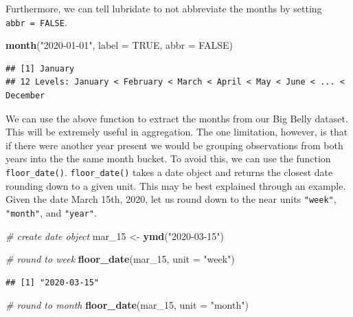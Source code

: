\documentclass[
]{book}
\newenvironment{Shaded}{\begin{snugshade}}{\end{snugshade}}
\newcommand{\CommentTok}[1]{\textcolor[rgb]{0.56,0.35,0.01}{\textit{#1}}}
\newcommand{\DataTypeTok}[1]{\textcolor[rgb]{0.13,0.29,0.53}{#1}}
\newcommand{\DecValTok}[1]{\textcolor[rgb]{0.00,0.00,0.81}{#1}}
\newcommand{\KeywordTok}[1]{\textcolor[rgb]{0.13,0.29,0.53}{\textbf{#1}}}
\newcommand{\NormalTok}[1]{#1}
\newcommand{\OtherTok}[1]{\textcolor[rgb]{0.56,0.35,0.01}{#1}}
\newcommand{\StringTok}[1]{\textcolor[rgb]{0.31,0.60,0.02}{#1}}
\begin{document}
Furthermore, we can tell lubridate to not abbreviate the months by setting \texttt{abbr\ =\ FALSE}.

\begin{Shaded}
\begin{Highlighting}[]
\KeywordTok{month}\NormalTok{(}\StringTok{"2020{-}01{-}01"}\NormalTok{, }\DataTypeTok{label =} \OtherTok{TRUE}\NormalTok{, }\DataTypeTok{abbr =} \OtherTok{FALSE}\NormalTok{)}
\end{Highlighting}
\end{Shaded}

\begin{verbatim}
## [1] January
## 12 Levels: January < February < March < April < May < June < ... < December
\end{verbatim}

We can use the above function to extract the months from our Big Belly dataset. This will be extremely useful in aggregation. The one limitation, however, is that if there were another year present we would be grouping observations from both years into the the same month bucket. To avoid this, we can use the function \texttt{floor\_date()}. \texttt{floor\_date()} takes a date object and returns the closest date rounding down to a given unit. This may be best explained through an example. Given the date March 15th, 2020, let us round down to the near units \texttt{"week"}, \texttt{"month"}, and \texttt{"year"}.

\begin{Shaded}
\begin{Highlighting}[]
\CommentTok{\# create date object}
\NormalTok{mar\_}\DecValTok{15}\NormalTok{ \textless{}{-}}\StringTok{ }\KeywordTok{ymd}\NormalTok{(}\StringTok{"2020{-}03{-}15"}\NormalTok{)}

\CommentTok{\# round to week}
\KeywordTok{floor\_date}\NormalTok{(mar\_}\DecValTok{15}\NormalTok{, }\DataTypeTok{unit =} \StringTok{"week"}\NormalTok{)}
\end{Highlighting}
\end{Shaded}

\begin{verbatim}
## [1] "2020-03-15"
\end{verbatim}

\begin{Shaded}
\begin{Highlighting}[]
\CommentTok{\# round to month}
\KeywordTok{floor\_date}\NormalTok{(mar\_}\DecValTok{15}\NormalTok{, }\DataTypeTok{unit =} \StringTok{"month"}\NormalTok{)}
\end{Highlighting}
\end{Shaded}
\end{document}

